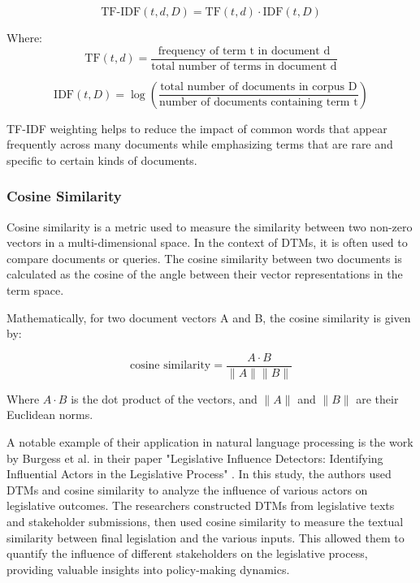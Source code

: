 \documentclass[a4paper, oneside]{discothesis}
\begin{document}
\begin{equation}
\text{TF-IDF}(t,d,D) = \text{TF}(t,d) \cdot \text{IDF}(t,D)
\end{equation}

Where:
\begin{equation}
\text{TF}(t,d) = \frac{\text{frequency of term t in document d}}{\text{total number of terms in document d}}
\end{equation}

\begin{equation}
\text{IDF}(t,D) = \log\left(\frac{\text{total number of documents in corpus D}}{\text{number of documents containing term t}}\right)
\end{equation}

TF-IDF weighting helps to reduce the impact of common words that appear frequently across many documents while emphasizing terms that are rare and specific to certain kinds of documents.

\subsubsection{Cosine Similarity}
Cosine similarity is a metric used to measure the similarity between two non-zero vectors in a multi-dimensional space. In the context of DTMs, it is often used to compare documents or queries. The cosine similarity between two documents is calculated as the cosine of the angle between their vector representations in the term space.

Mathematically, for two document vectors A and B, the cosine similarity is given by:

\begin{equation}
\text{cosine similarity} = \frac{A \cdot B}{\|A\| \|B\|}
\end{equation}

Where $A \cdot B$ is the dot product of the vectors, and $\|A\|$ and $\|B\|$ are their Euclidean norms.

A notable example of their application in natural language processing is the work by Burgess et al. in their paper "Legislative Influence Detectors: Identifying Influential Actors in the Legislative Process" \cite{burgess2016legislative}. In this study, the authors used DTMs and cosine similarity to analyze the influence of various actors on legislative outcomes.
The researchers constructed DTMs from legislative texts and stakeholder submissions, then used cosine similarity to measure the textual similarity between final legislation and the various inputs. This allowed them to quantify the influence of different stakeholders on the legislative process, providing valuable insights into policy-making dynamics.
\end{document}

